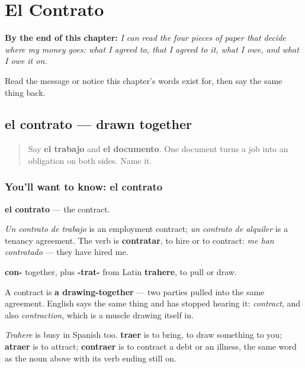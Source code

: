 
\chapter{El Contrato}
\label{ch:es-trato}

\begin{chapteropening}
\textbf{By the end of this chapter:} \emph{I can read the four pieces of paper that decide where my money goes: what I agreed to, that I agreed to it, what I owe, and what I owe it on.}

Read the message or notice this chapter's words exist for, then say the same thing back.
\end{chapteropening}

\section[el contrato]{el contrato — drawn together}

\label{lesson:ES-C441-contrato}



\begin{quote}
Say \textbf{el trabajo} and \textbf{el documento}. One document turns a job into an obligation on both sides. Name it.
\end{quote}

\subsection*{You'll want to know: el contrato}
\textbf{el contrato} — the contract.

\emph{Un contrato de trabajo} is an employment contract; \emph{un contrato de alquiler} is a tenancy agreement. The verb is \textbf{contratar}, to hire or to contract: \emph{me han contratado} — they have hired me.

\begin{cousinweb}
\textbf{con-} together, plus \textbf{-trat-} from Latin \textbf{trahere}, to pull or draw.

A contract is \textbf{a drawing-together} — two parties pulled into the same agreement. English says the same thing and has stopped hearing it: \emph{contract}, and also \emph{contraction}, which is a muscle drawing itself in.

\emph{Trahere} is busy in Spanish too. \textbf{traer} is to bring, to draw something to you; \textbf{atraer} is to attract; \textbf{contraer} is to contract a debt or an illness, the same word as the noun above with its verb ending still on.
\end{cousinweb}

